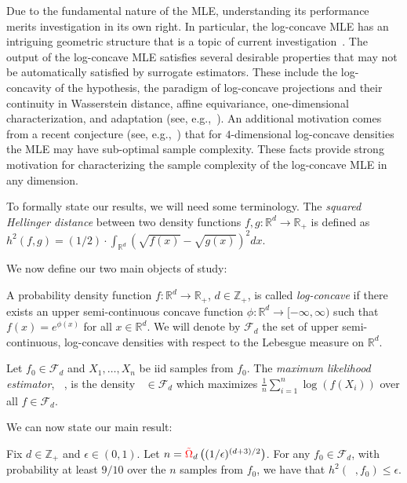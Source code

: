 \documentclass[final,12pt]{colt2018}
\newcommand{\nnew}[1]{{\color{red} #1}}
\newcommand{\nnew}[1]{#1}
\newtheorem{informal theorem}[theorem]{Theorem (informal statement)}
\newcommand{\R}{\mathbb{R}}
\newcommand{\Z}{\mathbb{Z}}
\newcommand{\eps}{\epsilon}
\newcommand{\mle}{\mathop{\hat{f}_n}}
\begin{document}
Due to the fundamental nature of the MLE, understanding its performance merits investigation
in its own right. In particular, the log-concave MLE has an intriguing geometric structure
that is a topic of current investigation~\cite{Cule10a, RSU17}.
The output of the log-concave MLE 
satisfies several desirable properties 
that may not be automatically satisfied by surrogate estimators. 
These include the log-concavity of the hypothesis, 
the paradigm of log-concave projections and their continuity in Wasserstein distance, affine equivariance, 
one-dimensional characterization, and adaptation (see, e.g.,~\cite{Sam17-survey}). 
An additional motivation comes from a recent conjecture (see, e.g.,~\cite{Wellner15}) that 
for $4$-dimensional log-concave densities the MLE may have sub-optimal sample complexity.  
These facts provide strong motivation for characterizing the sample complexity of the log-concave MLE
in any dimension.

To formally state our results, we will need some terminology.
The {\em squared Hellinger distance} between two density functions $f, g: \R^d \to \R_+$ is defined as 
$h^2(f, g) = (1/2) \cdot \int_{\R^d} ( \sqrt{f(x)} - \sqrt{g(x)})^2 dx$.

We now define our two main objects of study:

\begin{definition} \label{def:lc}
A probability density function $f : \R^d \to \R_+$, $d \in \Z_+$, is called {\em log-concave}
if there exists an upper semi-continuous concave function $\phi: \R^d \to [-\infty, \infty)$
such that $f(x) = e^{\phi(x)}$ for all $x \in \R^d$.
We will denote by $\mathcal{F}_d$ the set of upper semi-continuous,
log-concave densities with respect to the Lebesgue
measure on $\R^d$.
\end{definition}


\begin{definition} \label{def:mle}
Let $f_0 \in \mathcal{F}_d$ and $X_1, \ldots, X_n$ be iid samples from $f_0$.
The {\em maximum likelihood estimator}, $\mle$, 
is the density $\mle \in \mathcal{F}_d$ which maximizes
$\frac{1}{n} \sum_{i=1}^n \log(f(X_i))$ over all $f \in \mathcal{F}_d$.
\end{definition}

\noindent We can now state our main result:

\begin{theorem} \label{thm:main}
Fix $d \in \Z_+$ and $\eps \in (0,1)$.
Let $ n = \nnew{\tilde{\Omega}}_d \left( (1/\eps)^{(d+3)/2} \right)$.
For any $f_0 \in  \mathcal{F}_d$, with probability at least $9/10$ over the $n$ samples from $f_0$, we have that
$h^2(\mle, f_0) \leq \eps$.
\end{theorem}
\end{document}
